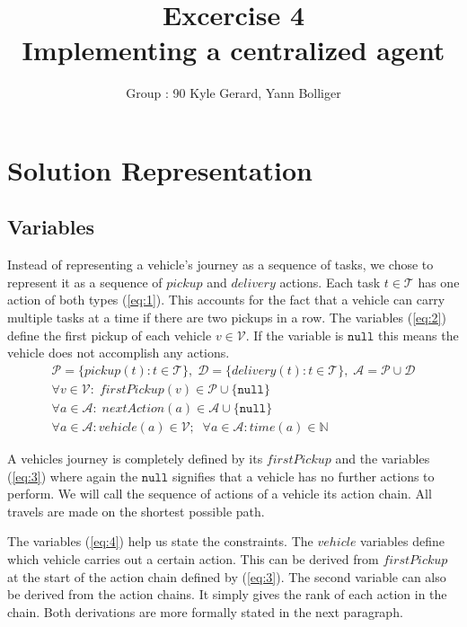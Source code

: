 \documentclass[11pt]{article}
\title{\bf Excercise 4\\ Implementing a centralized agent}
\author{Group \textnumero : 90  Kyle Gerard, Yann Bolliger}
\begin{document}
 \maketitle

 \section{Solution Representation}

 \subsection{Variables}

 Instead of representing a vehicle's journey as a sequence of tasks, we chose to
 represent it as a sequence of $pickup$ and $delivery$ actions. Each task $t \in
 \mathcal{T}$ has one action of both types (\ref{eq:1}). This accounts for the
 fact that a vehicle can carry multiple tasks at a time if there are two pickups
 in a row.
 The variables (\ref{eq:2}) define the first pickup of each vehicle
 $v \in \mathcal{V}$. If the variable is $\mathtt{null}$ this means the vehicle
 does not accomplish any actions.
 \begin{eqnarray}
  \label{eq:1}
  \mathcal{P} = \{pickup(t) : t \in \mathcal{T}\} , \;
  \mathcal{D} = \{delivery(t) : t \in \mathcal{T}\} , \;
  \mathcal{A} =  \mathcal{P} \cup \mathcal{D}
  \\
  \label{eq:2}
  \forall v \in \mathcal{V}  : \;
  firstPickup(v)  \in \mathcal{P} \cup \{\mathtt{null}\}
  \\
  \label{eq:3}
  \forall a \in \mathcal{A}  : \;
  nextAction(a) \in \mathcal{A}  \cup \{\mathtt{null}\}
  \\
  \label{eq:4}
  \forall a \in \mathcal{A}  :
  vehicle(a) \in \mathcal{V};
  \;\;
  \forall a \in \mathcal{A}  :
  time(a) \in \mathbb{N}
 \end{eqnarray}

 A vehicles journey is completely defined by its $firstPickup$ and the variables
 (\ref{eq:3}) where again the $\mathtt{null}$ signifies that a vehicle has no
 further actions to perform. We will call the sequence of actions of a vehicle
 its action chain. All travels are made on the shortest possible path.

 The variables (\ref{eq:4}) help us state the constraints. The $vehicle$
 variables define which vehicle carries out a certain action. This can be derived
 from $firstPickup$ at the start of the action chain defined by (\ref{eq:3}). The
 second variable can also be derived from the action chains. It simply gives the
 rank of each action in the chain. Both derivations are more formally stated in
 the next paragraph.
\end{document}
